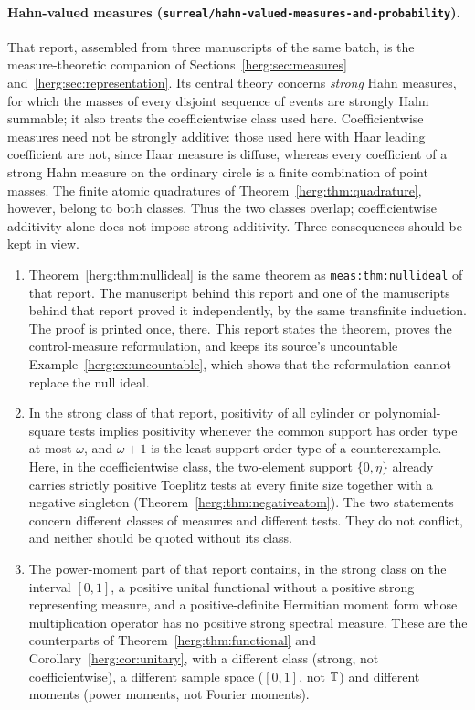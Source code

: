\documentclass[11pt,letterpaper]{article}
\theoremstyle{definition}
\newcommand{\repo}[1]{\nolinkurl{#1}}%
\newcommand{\lbl}[1]{\nolinkurl{#1}}%
\numberwithin{equation}{section}
\begin{document}
\paragraph{Hahn-valued measures (\repo{surreal/hahn-valued-measures-and-probability}).}
That report, assembled from three manuscripts of the same batch, is the measure-theoretic companion of Sections~\ref{herg:sec:measures} and~\ref{herg:sec:representation}. Its central theory concerns \emph{strong} Hahn measures, for which the masses of every disjoint sequence of events are strongly Hahn summable; it also treats the coefficientwise class used here. Coefficientwise measures need not be strongly additive: those used here with Haar leading coefficient are not, since Haar measure is diffuse, whereas every coefficient of a strong Hahn measure on the ordinary circle is a finite combination of point masses. The finite atomic quadratures of Theorem~\ref{herg:thm:quadrature}, however, belong to both classes. Thus the two classes overlap; coefficientwise additivity alone does not impose strong additivity. Three consequences should be kept in view.
\begin{enumerate}[label=(\roman*)]
\item Theorem~\ref{herg:thm:nullideal} is the same theorem as \lbl{meas:thm:nullideal} of that report. The manuscript behind this report and one of the manuscripts behind that report proved it independently, by the same transfinite induction. The proof is printed once, there. This report states the theorem, proves the control-measure reformulation, and keeps its source's uncountable Example~\ref{herg:ex:uncountable}, which shows that the reformulation cannot replace the null ideal.
\item In the strong class of that report, positivity of all cylinder or polynomial-square tests implies positivity whenever the common support has order type at most $\omega$, and $\omega+1$ is the least support order type of a counterexample. Here, in the coefficientwise class, the two-element support $\{0,\eta\}$ already carries strictly positive Toeplitz tests at every finite size together with a negative singleton (Theorem~\ref{herg:thm:negativeatom}). The two statements concern different classes of measures and different tests. They do not conflict, and neither should be quoted without its class.
\item The power-moment part of that report contains, in the strong class on the interval $[0,1]$, a positive unital functional without a positive strong representing measure, and a positive-definite Hermitian moment form whose multiplication operator has no positive strong spectral measure. These are the counterparts of Theorem~\ref{herg:thm:functional} and Corollary~\ref{herg:cor:unitary}, with a different class (strong, not coefficientwise), a different sample space ($[0,1]$, not $\mathbb T$) and different moments (power moments, not Fourier moments).
\end{enumerate}
\end{document}
